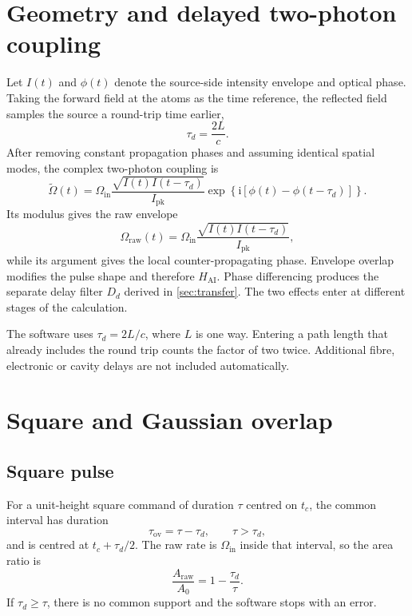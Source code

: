 \documentclass[11pt,a4paper]{article}
\newcommand{\ii}{\mathrm{i}}
\newcommand{\Hatom}{H_{\mathrm{AI}}}
\newcommand{\taud}{\tau_{d}}
\newcommand{\Oraw}{\Omega_{\mathrm{raw}}}
\begin{document}
\section{Geometry and delayed two-photon coupling}

Let $I(t)$ and $\phi(t)$ denote the source-side intensity envelope and optical phase. Taking the forward field at the atoms as the time reference, the reflected field samples the source a round-trip time earlier,
\begin{equation}
  \taud=\frac{2L}{c}.
  \label{eq:delay}
\end{equation}
After removing constant propagation phases and assuming identical spatial modes, the complex two-photon coupling is
\begin{equation}
 \widetilde{\Omega}(t)=\Omega_{\mathrm{in}}
 \frac{\sqrt{I(t)I(t-\taud)}}{I_{\mathrm{pk}}}
 \exp\!\left\{\ii[\phi(t)-\phi(t-\taud)]\right\}.
 \label{eq:complex-rabi}
\end{equation}
Its modulus gives the raw envelope
\begin{equation}
 \Oraw(t)=\Omega_{\mathrm{in}}
 \frac{\sqrt{I(t)I(t-\taud)}}{I_{\mathrm{pk}}},
 \label{eq:raw-rabi}
\end{equation}
while its argument gives the local counter-propagating phase. Envelope overlap modifies the pulse shape and therefore $\Hatom$. Phase differencing produces the separate delay filter $D_d$ derived in \cref{sec:transfer}. The two effects enter at different stages of the calculation.

\begin{warningbox}[Definition of $L$]
The software uses $\taud=2L/c$, where $L$ is one way. Entering a path length that already includes the round trip counts the factor of two twice. Additional fibre, electronic or cavity delays are not included automatically.
\end{warningbox}

\section{Square and Gaussian overlap}

\subsection{Square pulse}

For a unit-height square command of duration $\tau$ centred on $t_c$, the common interval has duration
\begin{equation}
 \tau_{\mathrm{ov}}=\tau-\taud,
 \qquad \tau>\taud,
 \label{eq:square-overlap}
\end{equation}
and is centred at $t_c+\taud/2$. The raw rate is $\Omega_{\mathrm{in}}$ inside that interval, so the area ratio is
\begin{equation}
 \frac{A_{\mathrm{raw}}}{A_0}=1-\frac{\taud}{\tau}.
 \label{eq:square-area-ratio}
\end{equation}
If $\taud\geq\tau$, there is no common support and the software stops with an error.
\end{document}
